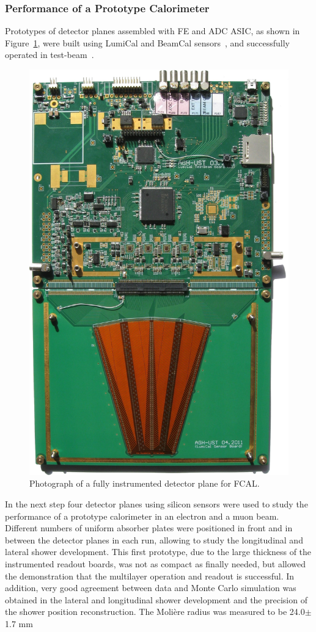 \subsubsection{Performance of a Prototype Calorimeter}

Prototypes of detector planes assembled with FE and ADC ASIC,
as shown in Figure~\ref{fig:fcal_lumical_module_photo},
were built using LumiCal and BeamCal sensors~\cite{1748-0221-7-01-T01004}, and successfully operated in 
test-beam~\cite{Abramowicz:2014gdq}.
\begin{figure}[hbp]
\centering
\includegraphics[width=0.35\columnwidth,angle=90]{Calorimeter/FCAL/figs/tb3_complete_module}
\caption{Photograph of a fully instrumented detector plane for FCAL.}
\label{fig:fcal_lumical_module_photo}
\end{figure}
In the next step four detector planes using silicon sensors were used to
study the performance of a prototype calorimeter in an electron and a muon beam. Different numbers of uniform
absorber plates were positioned in front and in between the detector planes in each
run, allowing to study the longitudinal and lateral shower development.
This first prototype, due to the large thickness of the instrumented readout boards, was not as compact as finally needed, but
allowed the demonstration that the multilayer operation and readout is successful. In addition, very good
agreement between data and Monte Carlo simulation
was obtained in the lateral and longitudinal shower development and the precision of the shower position reconstruction. The Moli\`ere 
radius was measured to be 24.0$\pm$1.7 mm
